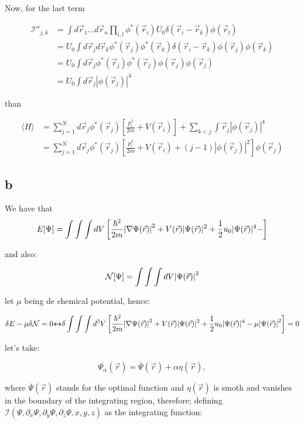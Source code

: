 \documentclass[12pt]{article}
\begin{document}
\begin{flushleft}
Now, for the last term

\begin{align*}
    \mathcal{I''}_{j,k} &= \int d\vec{r}_{1} ... d\vec{r}_{n} \prod_{i,l} \phi^{*}(\vec{r}_{i}) U_0 \delta(\vec{r}_{i}  -\vec{r}_{k}) \phi(\vec{r}_{l})\\
    &= U_0 \int d\vec{r}_{j} d\vec{r}_{k} \phi^{*}(\vec{r}_{j}) \phi^{*}(\vec{r}_{k})  \delta(\vec{r}_{i} -\vec{r}_{k}) \phi(\vec{r}_{j}) \phi(\vec{r}_{k}) \\ &= U_0 \int d\vec{r}_{j} \phi^{*}(\vec{r}_{j}) \phi^{*}(\vec{r}_{j}) \phi(\vec{r}_{j}) \phi(\vec{r}_{j}) \\
    &= U_0 \int d \vec{r}_{j} |\phi(\vec{r}_{j})|^{4}
\end{align*}

than

\begin{align*}
    \langle H \rangle &= \sum_{j=1}^{N} d\vec{r}_{j} \phi^{*}(\vec{r}_{j}) \left[ \frac{p_{i}^{2}}{2m}  + V(\vec{r}_{i}) \right] + \sum_{k<j} \int \vec{r}_{j} |\phi(\vec{r}_{j})|^{4} \\ 
    &= \sum_{j=1}^{N} d\vec{r}_{j} \phi^{*}(\vec{r}_{j}) \left[ \frac{p_{i}^{2}}{2m}  + V(\vec{r}_{i}) + (j-1) |\phi(\vec{r}_{j})|^{2} \right] \phi(\vec{r}_{j})
\end{align*}

\subsection*{b}
We have that
\[
E[\Psi] = \int \int \int d V \left[ \frac{\hbar^{2}}{2m} \abs{\nabla \Psi(\Vec{r})}^{2} + V(\vec{r}) |\Psi(\Vec{r})|^2 + \frac{1}{2} u_{0} |\Psi(\Vec{r})|^4 - \right]
\]

and also:

\[
\mathcal{N}[\Psi] = \int \int \int dV \abs{\Psi(\Vec{r})}^{2} \]

let $\mu$ being de chemical potential, hence:

\[
\delta E - \mu \delta \mathcal{N} = 0 \boldsymbol{{\leftrightarrow}} \delta \int \int \int d^3 V \left[ \frac{\hbar^{2}}{2m} \abs{\nabla \Psi(\Vec{r})}^{2} + V(\vec{r}) |\Psi(\Vec{r})|^2 + \frac{1}{2} u_{0} |\Psi(\Vec{r})|^4 - \mu \abs{\Psi(\Vec{r})}^{2} \right] = 0
 \]

 let's take:

 \[
 \overline{\Psi_{\alpha}}(\Vec{r}) = \overline{\Psi}(\Vec{r}) + \alpha \eta(\vec{r}),
 \]

where $\overline{\Psi}(\Vec{r})$ stands for the optimal function and $\eta(\vec{r})$ is smoth and vanishes in the boundary of the integrating region, therefore; defining $\mathbf{\mathcal{I}}(\Psi, \partial_{x}\Psi,
\partial_{y}\Psi, \partial_{z}\Psi, x, y,  z)$ as the integrating function: 



\end{flushleft}
\end{document}
